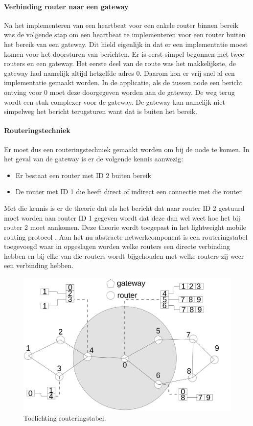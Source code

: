 \documentclass[a4paper, 11pt, oneside]{report}
\begin{document}
\paragraph{Verbinding router naar een gateway}
Na het implementeren van een heartbeat voor een enkele router binnen bereik was de volgende stap om een heartbeat te implementeren voor een router buiten het bereik van een gateway. Dit hield eigenlijk in dat er een implementatie moest komen voor het doorsturen van berichten. Er is eerst simpel begonnen met twee routers en een gateway. Het eerste deel van de route was het makkelijkste, de gateway had namelijk altijd hetzelfde adres 0. Daarom kon er vrij snel al een implementatie gemaakt worden. In de applicatie, als de tussen node een bericht ontving voor 0 moet deze doorgegeven worden aan de gateway. De weg terug wordt een stuk complexer voor de gateway. De gateway kan namelijk niet simpelweg het bericht terugsturen want dat is buiten het bereik.
\paragraph{Routeringstechniek}
Er moet dus een routeringstechniek gemaakt worden om bij de node te komen.
In het geval van de gateway is er de volgende kennis aanwezig:
\begin{itemize}
	\item Er bestaat een router met ID 2 buiten bereik
	\item De router met ID 1 die heeft direct of indirect een connectie met die router
\end{itemize}

Met die kennis is er de theorie dat als het bericht dat naar router ID 2 gestuurd moet worden aan router ID 1 gegeven wordt dat deze dan wel weet hoe het bij router 2 moet aankomen.
Deze theorie wordt toegepast in het lightweight mobile routing protocol \cite{LMR}.
Aan het nu abstracte netwerkcomponent is een routeringstabel toegevoegd waar in opgeslagen worden welke routers een directe verbinding hebben en bij elke van die routers wordt bijgehouden met welke routers zij weer een verbinding hebben.

\begin{figure}[H]
	\begin{center}\includegraphics[width=0.6\linewidth]{Afbeeldingen/uitlegtabel.png}\end{center}
	\caption{Toelichting routeringstabel.}
	\label{fig:routeringstabel}
\end{figure}
\end{document}

